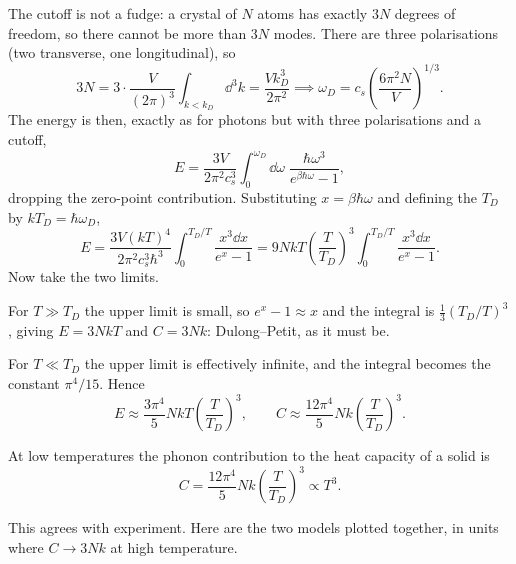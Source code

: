 \documentclass[a4paper]{scrartcl}
\begin{document}
The cutoff is not a fudge: a crystal of $N$ atoms has exactly $3N$ degrees of freedom, so there cannot be more than $3N$ modes. There are three polarisations (two transverse, one longitudinal), so
$$
3N = 3\cdot \frac{V}{(2\pi)^3}\int_{k < k_D}\dd^3 k = \frac{V k_D^3}{2\pi^2} \implies \omega_D = c_s\left(\frac{6\pi^2 N}{V}\right)^{1/3}.
$$
The energy is then, exactly as for photons but with three polarisations and a cutoff,
$$
E = \frac{3V}{2\pi^2c_s^3}\int_0^{\omega_D} \dd\omega\; \frac{\hbar\omega^3}{e^{\beta\hbar\omega}-1},
$$
dropping the zero-point contribution. Substituting $x = \beta\hbar\omega$ and defining the  $T_D$ by $kT_D = \hbar\omega_D$,
$$
E = \frac{3V (kT)^4}{2\pi^2 c_s^3\hbar^3}\int_0^{T_D/T}\frac{x^3\dd x}{e^x - 1} = 9NkT\left(\frac{T}{T_D}\right)^3\int_0^{T_D/T}\frac{x^3\dd x}{e^x-1}.
$$
Now take the two limits.

For $T \gg T_D$ the upper limit is small, so $e^x - 1 \approx x$ and the integral is $\tfrac 13 (T_D/T)^3$, giving $E = 3NkT$ and $C = 3Nk$: Dulong--Petit, as it must be.

For $T \ll T_D$ the upper limit is effectively infinite, and the integral becomes the constant $\pi^4/15$. Hence
$$
E \approx \frac{3\pi^4}{5}NkT\left(\frac{T}{T_D}\right)^3, \qquad C \approx \frac{12\pi^4}{5}Nk\left(\frac{T}{T_D}\right)^3.
$$

\begin{proposition}
	At low temperatures the phonon contribution to the heat capacity of a solid is
	$$
	C = \frac{12\pi^4}{5}Nk\left(\frac{T}{T_D}\right)^3 \propto T^3.
	$$
\end{proposition}

This agrees with experiment. Here are the two models plotted together, in units where $C \to 3Nk$ at high temperature.
\end{document}
